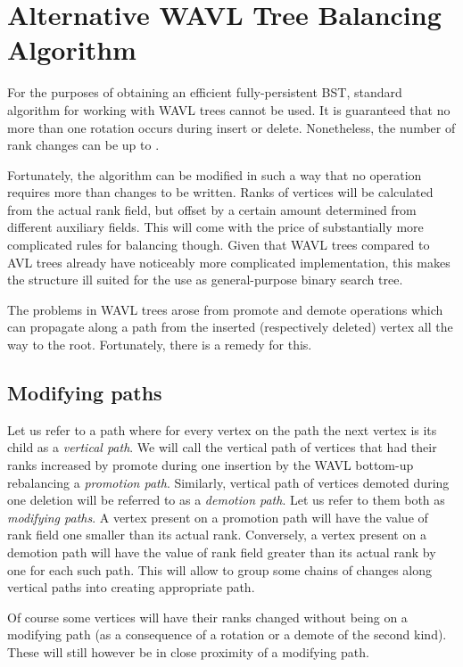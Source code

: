 \chapter{Alternative WAVL Tree Balancing Algorithm}

For the purposes of obtaining an efficient fully-persistent BST, standard algorithm for working with WAVL trees cannot be used. 
It is guaranteed that no more than one rotation occurs during insert or delete. 
Nonetheless, the number of rank changes can be up to . 

Fortunately, the algorithm can be modified in such a way that no operation requires more than  changes to be written. 
Ranks of vertices will be calculated from the actual rank field, but offset by a certain amount determined from different auxiliary fields. 
This will come with the price of substantially more complicated rules for balancing though. 
Given that WAVL trees compared to AVL trees already have noticeably more complicated implementation, this makes the structure ill suited for the use as general-purpose binary search tree. 

The problems in WAVL trees arose from promote and demote operations which can propagate along a path from the inserted (respectively deleted) vertex all the way to the root. 
Fortunately, there is a remedy for this. 

\section{Modifying paths}

Let us refer to a path where for every vertex on the path the next vertex is its child as a {\em vertical path}.
We will call the vertical path of vertices that had their ranks increased by promote during one insertion by the WAVL bottom-up rebalancing a {\em promotion path}. 
Similarly, vertical path of vertices demoted during one deletion will be referred to as a {\em demotion path}.
Let us refer to them both as {\em modifying paths}.
A vertex present on a promotion path will have the value of rank field one smaller than its actual rank. Conversely, a vertex present on a demotion path will have the value of rank field greater than its actual rank by one for each such path. This will allow to group some chains of changes along vertical paths into creating appropriate path.

Of course some vertices will have their ranks changed without being on a modifying path (as a consequence of a rotation or a demote of the second kind). These will still however be in close proximity of a modifying path.

